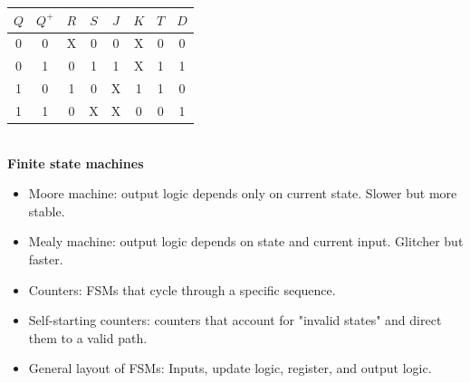 \documentclass{article}
\begin{document}
\begin{tabular}{|cc|cc|cc|c|c|}
    \hline
    $Q$ & $Q^+$ & $R$ & $S$ & $J$ & $K$ & $T$ & $D$ \\
    \hline
    0 & 0 & X & 0 & 0 & X & 0 & 0 \\
    0 & 1 & 0 & 1 & 1 & X & 1 & 1 \\
    1 & 0 & 1 & 0 & X & 1 & 1 & 0 \\
    1 & 1 & 0 & X & X & 0 & 0 & 1 \\
    \hline
\end{tabular} \\
\textbf{Finite state machines}
\begin{itemize}
    \item Moore machine: output logic depends only on current state. Slower but more stable.
    \item Mealy machine: output logic depends on state and current input. Glitcher but faster.
    \item Counters: FSMs that cycle through a specific sequence.
    \item Self-starting counters: counters that account for "invalid states" and direct them to a valid path.
    \item General layout of FSMs: Inputs, update logic, register, and output logic.
\end{itemize}
\end{document}

